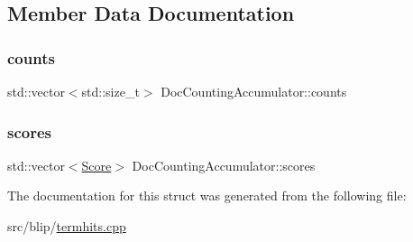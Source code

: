 \subsection{Member Data Documentation}
\mbox{\label{structDocCountingAccumulator_a51342bf3c7bbe0d36de35762064ed580}} 
\subsubsection{\texorpdfstring{counts}{counts}}
{\footnotesize\ttfamily std\+::vector$<$std\+::size\+\_\+t$>$ Doc\+Counting\+Accumulator\+::counts}

\mbox{\label{structDocCountingAccumulator_a456d654fee187beb12d802ab7d48fb15}} 
\subsubsection{\texorpdfstring{scores}{scores}}
{\footnotesize\ttfamily std\+::vector$<$\mbox{\hyperlink{structbloodhound_1_1Score}{Score}}$>$ Doc\+Counting\+Accumulator\+::scores}



The documentation for this struct was generated from the following file\+:\begin{DoxyCompactItemize}
\item 
src/blip/\mbox{\hyperlink{termhits_8cpp}{termhits.\+cpp}}\end{DoxyCompactItemize}
